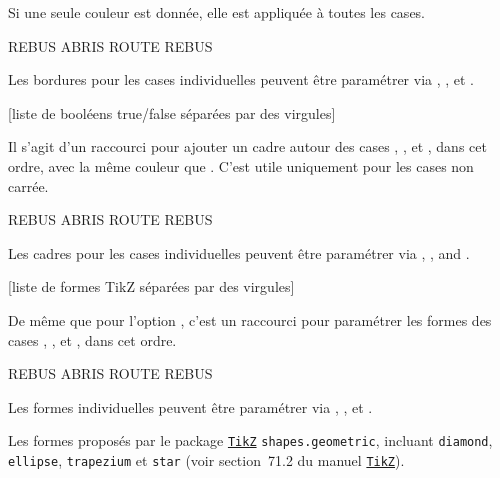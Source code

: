\documentclass[svgnames]{report}
\newcommand\ctan[1]{\href{https://www.ctan.org/pkg/#1}{\texttt{#1}}}
\begin{document}
  Si une seule couleur est donnée, elle est appliquée à toutes les cases.

  \begin{example}
  \begin{GrilleSutom}[CouleurBordures={red,orange,blue}]{REBUS}
    ABRIS
    ROUTE
    REBUS
  \end{GrilleSutom}
  \end{example}

  Les bordures pour les cases individuelles peuvent être paramétrer via
  , ,  et .

  [liste de booléens true/false séparées par des virgules]

  Il s'agit d'un raccourci pour ajouter un cadre autour des cases , ,  et , dans cet ordre, avec la même couleur que . C'est utile uniquement pour les cases non carrée.

  \begin{example}
  \begin{GrilleSutom}[Cadres={false,true,true},Formes=circle]{REBUS}
    ABRIS
    ROUTE
    REBUS
  \end{GrilleSutom}
  \end{example}

  Les cadres pour les cases individuelles peuvent être paramétrer via , ,
   and .

  [liste de formes TikZ séparées par des virgules]

  De même que pour l'option , c'est un raccourci pour paramétrer les formes des cases , ,
   et , dans cet ordre.

  \begin{example}
  \begin{GrilleSutom}[Formes={circle, rectangle, circle}]{REBUS}
    ABRIS
    ROUTE
    REBUS
  \end{GrilleSutom}
  \end{example}

  Les formes individuelles peuvent être paramétrer via , ,
   et .

  Les formes proposés par le package \ctan{TikZ}
  \texttt{shapes.geometric}, incluant \texttt{diamond},
  \texttt{ellipse}, \texttt{trapezium} et \texttt{star} (voir section~71.2 du manuel \ctan{TikZ}).
\end{document}
